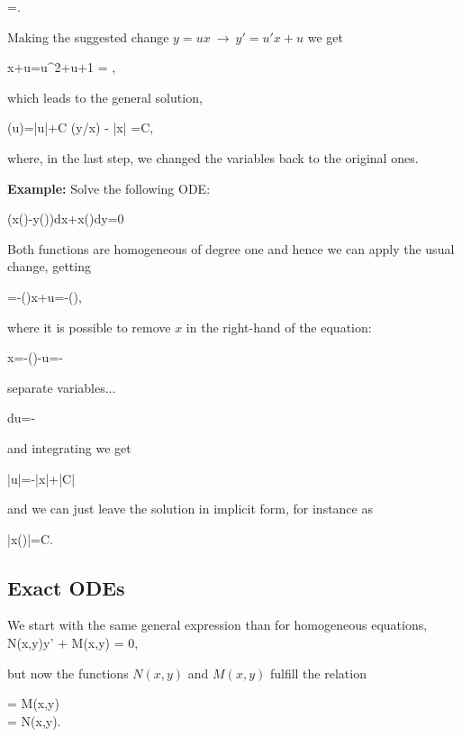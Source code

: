 \bnn
	=.
\enn

Making the suggested change $y=ux \ \rightarrow \ y'=u'x+u$ we get

\bnn
    x+u=u^2+u+1 \quad \rightarrow \int {} = \int {},
\enn

which leads to the general solution,

\bnn
	\arctan(u)=\ln |u|+C \quad \rightarrow \arctan(y/x) - \ln |x| =C,
\enn

where, in the last step, we changed the variables back to the original ones.

{\bf Example: }Solve the following ODE:

\bnn
	\left(x\sin\left(\right)-y\cos\left(\right)\right)dx+x\cos\left(\right)dy=0
\enn

 Both functions are homogeneous of degree one and hence we can apply the usual change, getting 

\bnn
	=-\left(\right)\Rightarrow{}x+u=-\left(\right),
\enn

where it is possible to remove $x$ in the right-hand of the equation:

\bnn
	x=-\left(\right)-u=-
\enn

separate variables...

\bnn
	du=-
\enn

and integrating we get

\bnn
	\ln|\sin u|=-\ln|x|+\ln|C|
\enn

and we can just leave the solution in implicit form, for instance as

\bnn
	\left|x\sin\left(\right)\right|=C.
\enn

\subsection{Exact ODEs}

We start with the same general expression than for homogeneous equations,
\bnn N(x,y)y' + M(x,y) = 0, \enn

but now the functions $N(x,y)$ and $M(x,y)$ fulfill the relation

\bnn 
	= M(x,y) \\
	= N(x,y). 
\enn

